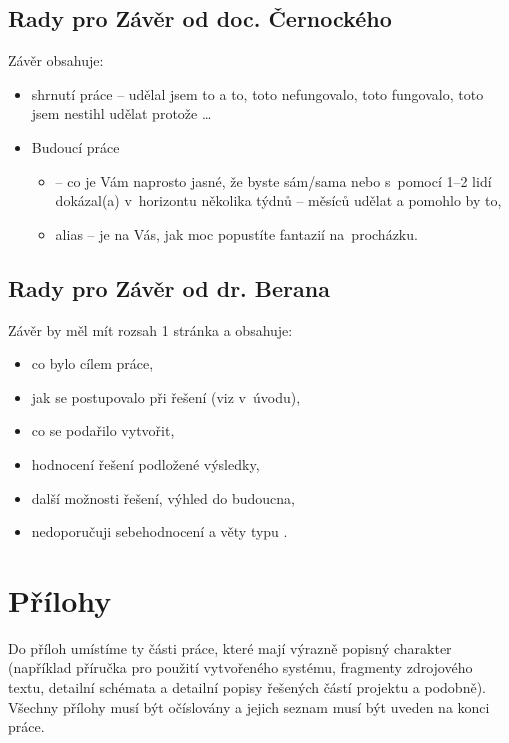 \subsection*{Rady pro Závěr od doc. Černockého}

Závěr obsahuje:
 \begin{itemize}
   \item{shrnutí práce -- udělal jsem to a to, toto nefungovalo, toto fungovalo, toto jsem nestihl udělat protože \ldots}
   \item{Budoucí práce
     \begin{itemize}
       \item{ -- co je Vám naprosto jasné, že byste sám/sama nebo s~pomocí 1--2 lidí dokázal(a) v~horizontu několika týdnů -- měsíců udělat a pomohlo by to,}
       \item{ alias  -- je na Vás, jak moc popustíte fantazií na~procházku.}
     \end{itemize}}
\end{itemize}


\subsection*{Rady pro Závěr od dr. Berana}
Závěr by měl mít rozsah 1 stránka a obsahuje:
    \begin{itemize}
      \item{co bylo cílem práce,}
      \item{jak se postupovalo při řešení (viz  v~úvodu),}
      \item{co se podařilo vytvořit,}
      \item{hodnocení řešení podložené výsledky,}
      \item{další možnosti řešení, výhled do budoucna,}
      \item{nedoporučuji sebehodnocení a věty typu .}
    \end{itemize}

\section{Přílohy}

Do příloh umístíme ty části práce, které mají výrazně popisný charakter (například příručka pro použití vytvořeného systému, fragmenty zdrojového textu, detailní schémata a detailní popisy řešených částí projektu a podobně). Všechny přílohy musí být očíslovány a jejich seznam musí být uveden na konci práce. \cite{fitWeb}

